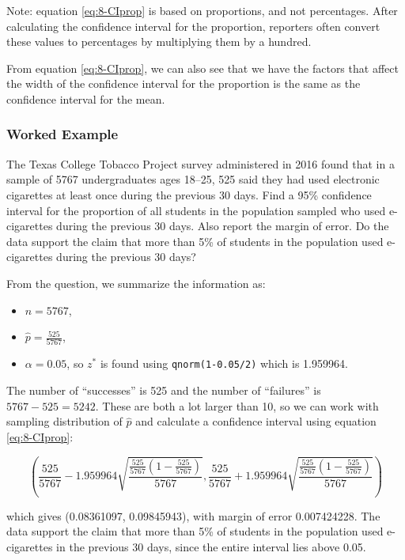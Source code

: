 \documentclass[
]{book}
\providecommand{\tightlist}{%
  \setlength{\itemsep}{0pt}\setlength{\parskip}{0pt}}
\theoremstyle{definition}
\theoremstyle{definition}
\theoremstyle{definition}
\theoremstyle{definition}
\theoremstyle{remark}
\begin{document}
Note: equation \eqref{eq:8-CIprop} is based on proportions, and not percentages. After calculating the confidence interval for the proportion, reporters often convert these values to percentages by multiplying them by a hundred.

From equation \eqref{eq:8-CIprop}, we can also see that we have the factors that affect the width of the confidence interval for the proportion is the same as the confidence interval for the mean.

\hypertarget{worked-example-1}{%
\subsubsection{Worked Example}\label{worked-example-1}}

The Texas College Tobacco Project survey administered in 2016 found that in a sample of 5767 undergraduates ages 18--25, 525 said they had used electronic cigarettes at least once during the previous 30 days. Find a 95\% confidence interval for the proportion of all students in the population sampled who used e-cigarettes during the previous 30 days. Also report the margin of error. Do the data support the claim that more than 5\% of students in the population used e-cigarettes during the previous 30 days?

From the question, we summarize the information as:

\begin{itemize}
\tightlist
\item
  \(n = 5767\),
\item
  \(\hat{p} = \frac{525}{5767}\),
\item
  \(\alpha = 0.05\), so \(z^*\) is found using \texttt{qnorm(1-0.05/2)} which is 1.959964.
\end{itemize}

The number of ``successes'' is 525 and the number of ``failures'' is \(5767-525 = 5242\). These are both a lot larger than 10, so we can work with sampling distribution of \(\hat{p}\) and calculate a confidence interval using equation \eqref{eq:8-CIprop}:

\[
\left( \frac{525}{5767} - 1.959964 \sqrt{\frac{\frac{525}{5767}(1-\frac{525}{5767})}{5767}} , \frac{525}{5767} + 1.959964 \sqrt{\frac{\frac{525}{5767}(1-\frac{525}{5767})}{5767}} \right)
\]

which gives (0.08361097, 0.09845943), with margin of error 0.007424228. The data support the claim that more than 5\% of students in the population used e-cigarettes in the previous 30 days, since the entire interval lies above 0.05.
\end{document}
